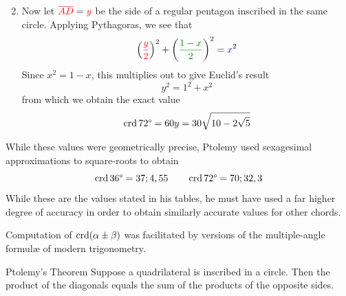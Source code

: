 \begin{enumerate}\setcounter{enumi}{1}
  \item Now let $\textcolor{red}{\cl{AD}}=\textcolor{red}{y}$ be the side of a regular pentagon inscribed in the same circle. Applying Pythagoras, we see that
  \[
  	\left(\textcolor{red}{\frac y2}\right)^2+\left(\textcolor{Green}{\frac{1-x}2}\right)^2=\textcolor{blue}{x}^2
  \]
  Since $x^2=1-x$, this multiplies out to give Euclid's result
  \[
  	y^2=1^2+x^2
  \]
  from which we obtain the exact value
  \[
  	\crd\ang{72}=60y=30\sqrt{10-2\sqrt 5}
  \]
\end{enumerate}
  
While these values were geometrically precise, Ptolemy used sexagesimal approximations to square-roots to obtain
\[
	\crd\ang{36} =37;4,55\qquad \crd\ang{72}=70;32,3
\]
While these are the values stated in his tables, he must have used a far higher degree of accuracy in order to obtain similarly accurate values for other chords.
\goodbreak



Computation of $\crd(\alpha\pm\beta)$ was facilitated by versions of the multiple-angle formulæ of modern trigonometry.

\begin{thm*}{Ptolemy's Theorem}{}
	Suppose a quadrilateral is inscribed in a circle. Then the product of the diagonals equals the sum of the products of the opposite sides.\footnotemark
\end{thm*}\label{pg:ptolemythm}


